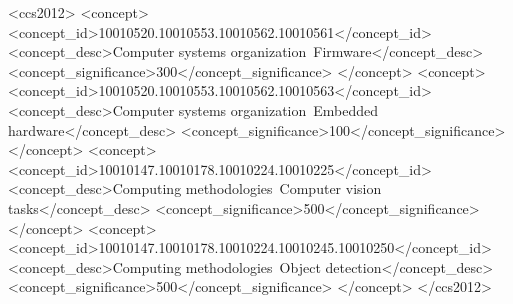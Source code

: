 \documentclass[acmsmall]{acmart}
\begin{document}
%
%
\begin{CCSXML}
<ccs2012>
   <concept>
       <concept_id>10010520.10010553.10010562.10010561</concept_id>
       <concept_desc>Computer systems organization~Firmware</concept_desc>
       <concept_significance>300</concept_significance>
       </concept>
   <concept>
       <concept_id>10010520.10010553.10010562.10010563</concept_id>
       <concept_desc>Computer systems organization~Embedded hardware</concept_desc>
       <concept_significance>100</concept_significance>
       </concept>
   <concept>
       <concept_id>10010147.10010178.10010224.10010225</concept_id>
       <concept_desc>Computing methodologies~Computer vision tasks</concept_desc>
       <concept_significance>500</concept_significance>
       </concept>
   <concept>
       <concept_id>10010147.10010178.10010224.10010245.10010250</concept_id>
       <concept_desc>Computing methodologies~Object detection</concept_desc>
       <concept_significance>500</concept_significance>
       </concept>
 </ccs2012>
\end{CCSXML}



%

%

%
\maketitle
\end{document}
